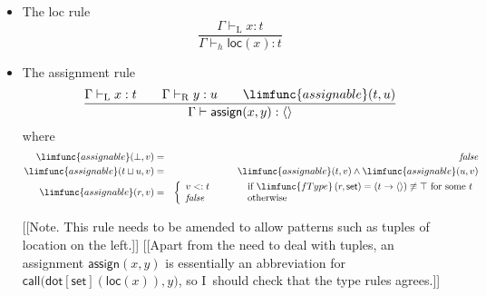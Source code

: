 \documentclass[12pt]{article}
\begin{document}
\begin{itemize}
\item The loc rule%
\begin{equation*}
\frac{\Gamma \vdash _{\mathrm{L}}x:t}{\Gamma \vdash _{h}\mathsf{loc}(x):t}
\end{equation*}

\item The assignment rule%
\begin{equation*}
\frac{\Gamma \vdash _{\mathrm{L}}x:t\qquad \Gamma \vdash _{\mathrm{R}%
}y:u\qquad \limfunc{assignable}(t,u)}{\Gamma \vdash \mathsf{assign}%
(x,y):\left\langle {}\right\rangle }
\end{equation*}%
where%
\begin{eqnarray*}
\limfunc{assignable}(\bot ,v) &=&\mathit{false} \\
\limfunc{assignable}(t\sqcup u,v) &=&\limfunc{assignable}(t,v)\wedge 
\limfunc{assignable}(u,v) \\
\limfunc{assignable}(r,v) &=&\left\{ 
\begin{array}{lll}
v<:t & \qquad & \text{if }\limfunc{fType}\left( r,\mathsf{set}\right)
=\left( t\rightarrow \left\langle {}\right\rangle \right) \not\equiv \top 
\text{ for some }t \\ 
\mathit{false} &  & \text{otherwise}%
\end{array}%
\right.
\end{eqnarray*}

[[Note. This rule needs to be amended to allow patterns such as tuples of
location on the left.]] [[Apart from the need to deal with tuples, an
assignment $\mathsf{assign}(x,y)$ is essentially an abbreviation for $%
\mathsf{call(dot}\left[ \mathsf{set}\right] (\mathsf{loc}(x)),y)$, so I\
should check that the type rules agrees.]]


\end{itemize}
\end{document}
